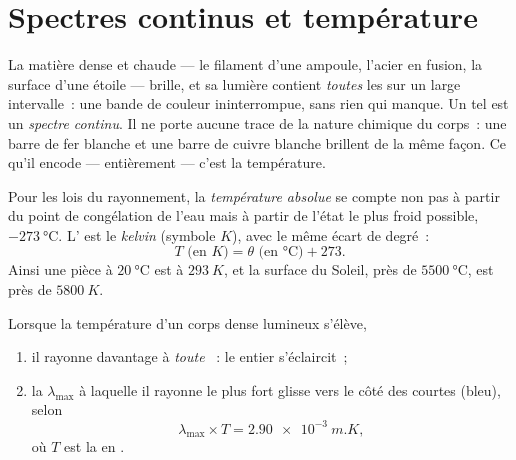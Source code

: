 \section{Spectres continus et température}

\begin{definition}\label{def:g10:light-spectra:continuous}
La matière dense et chaude --- le filament d'une ampoule, l'acier en
fusion, la surface d'une étoile --- brille, et sa lumière contient
\emph{toutes} les  sur un large intervalle~: une bande
de couleur ininterrompue, sans rien qui manque. Un tel
 est un \emph{spectre continu}. Il ne
porte aucune trace de la nature chimique du corps~: une barre de fer
blanche et une barre de cuivre blanche brillent de la même façon. Ce
qu'il encode --- entièrement --- c'est la température.
\end{definition}

\begin{definition}\label{def:g10:light-spectra:kelvin}
Pour les lois du rayonnement, la \emph{température
absolue} se compte non pas à partir du point
de congélation de l'eau mais à partir de l'état le plus froid possible,
$\qty{-273}{\degreeCelsius}$. L' est le
\emph{kelvin} (symbole $\unit{K}$), avec le même écart de
degré~:
\[
T \text{ (en } \unit{K}) = \theta \text{ (en } \unit{\degreeCelsius}) + 273 .
\]
Ainsi une pièce à $\qty{20}{\degreeCelsius}$ est à $\qty{293}{K}$, et
la surface du Soleil, près de $\qty{5500}{\degreeCelsius}$, est près de
$\qty{5800}{K}$.
\end{definition}

\begin{proposition}\label{prop:g10:light-spectra:wien}
Lorsque la température d'un corps dense lumineux s'élève,
\begin{enumerate}
  \item il rayonne davantage à \emph{toute} ~: le
         entier s'éclaircit~;
  \item la  $\lambda_{\max}$ à laquelle il rayonne le
        plus fort glisse vers le côté des courtes 
        (bleu), selon
        \[
        \lambda_{\max} \times T = \qty{2.90e-3}{m.K},
        \]
        où $T$ est la  en .
\end{enumerate}
\end{proposition}
\admitted

